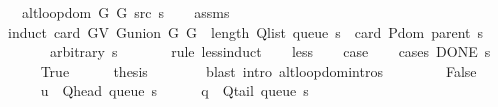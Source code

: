 \begin{isabellebody}
\ \ \ {\isachardoublequoteopen}alt{\isacharunderscore}{\kern0pt}loop{\isacharunderscore}{\kern0pt}dom\ {\isacharparenleft}{\kern0pt}G{}{\isacharcomma}{\kern0pt}\ G{}{\isacharcomma}{\kern0pt}\ src{\isacharcomma}{\kern0pt}\ s{\isacharparenright}{\kern0pt}{\isachardoublequoteclose}\isanewline
%
\isadelimproof
\ \ %
\endisadelimproof
%
\isatagproof
{}\isamarkupfalse%
\ assms\isanewline
{}\isamarkupfalse%
\ {\isacharparenleft}{\kern0pt}induct\ {\isachardoublequoteopen}card\ {\isacharparenleft}{\kern0pt}G{\isachardot}{\kern0pt}V\ {\isacharparenleft}{\kern0pt}G{\isachardot}{\kern0pt}union\ G{}\ G{}{\isacharparenright}{\kern0pt}{\isacharparenright}{\kern0pt}\ {\isacharplus}{\kern0pt}\ length\ {\isacharparenleft}{\kern0pt}Q{\isacharunderscore}{\kern0pt}list\ {\isacharparenleft}{\kern0pt}queue\ s{\isacharparenright}{\kern0pt}{\isacharparenright}{\kern0pt}\ {\isacharminus}{\kern0pt}\ card\ {\isacharparenleft}{\kern0pt}P{\isachardot}{\kern0pt}dom\ {\isacharparenleft}{\kern0pt}parent\ s{\isacharparenright}{\kern0pt}{\isacharparenright}{\kern0pt}{\isachardoublequoteclose}\isanewline
\ \ \ \ \ \ \ arbitrary{\isacharcolon}{\kern0pt}\ s\isanewline
\ \ \ \ \ \ \ rule{\isacharcolon}{\kern0pt}\ less{\isacharunderscore}{\kern0pt}induct{\isacharparenright}{\kern0pt}\isanewline
\ \ \isamarkupfalse%
\ less\isanewline
\ \ \isamarkupfalse%
\ {\isacharquery}{\kern0pt}case\isanewline
\ \ \isamarkupfalse%
\ {\isacharparenleft}{\kern0pt}cases\ {\isachardoublequoteopen}DONE\ s{\isachardoublequoteclose}{\isacharparenright}{\kern0pt}\isanewline
\ \ \ \ \isamarkupfalse%
\ True\isanewline
\ \ \ \ \isamarkupfalse%
\ {\isacharquery}{\kern0pt}thesis\isanewline
\ \ \ \ \ \ \isamarkupfalse%
\ {\isacharparenleft}{\kern0pt}blast\ intro{\isacharcolon}{\kern0pt}\ alt{\isacharunderscore}{\kern0pt}loop{\isachardot}{\kern0pt}domintros{\isacharparenright}{\kern0pt}\isanewline
\ \ \isamarkupfalse%
\isanewline
\ \ \ \ \isamarkupfalse%
\ False\isanewline
\ \ \ \ \isamarkupfalse%
\ {\isacharquery}{\kern0pt}u\ {\isacharequal}{\kern0pt}\ {\isachardoublequoteopen}Q{\isacharunderscore}{\kern0pt}head\ {\isacharparenleft}{\kern0pt}queue\ s{\isacharparenright}{\kern0pt}{\isachardoublequoteclose}\isanewline
\ \ \ \ \isamarkupfalse%
\ {\isacharquery}{\kern0pt}q\ {\isacharequal}{\kern0pt}\ {\isachardoublequoteopen}Q{\isacharunderscore}{\kern0pt}tail\ {\isacharparenleft}{\kern0pt}queue\ s{\isacharparenright}{\kern0pt}{\isachardoublequoteclose}\isanewline

\end{isabellebody}

